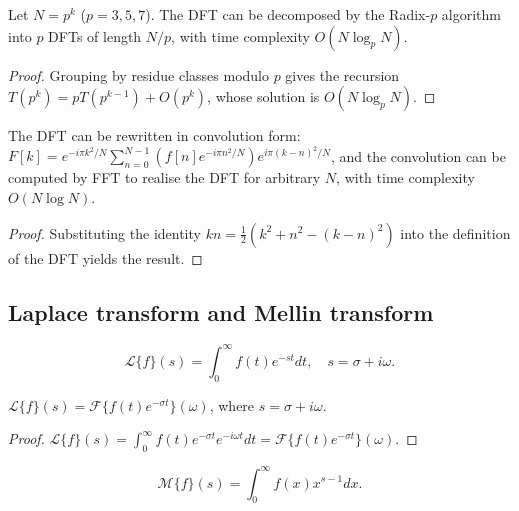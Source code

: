 \begin{theorem}\label{thm:radix_p_fft}
Let $N = p^k$ ($p = 3,5,7$). The DFT can be decomposed by the Radix-$p$ algorithm into $p$ DFTs of length $N/p$, with time complexity $O(N\log_p N)$.
\end{theorem}

\begin{proof}
Grouping by residue classes modulo $p$ gives the recursion $T(p^k) = pT(p^{k-1}) + O(p^k)$, whose solution is $O(N\log_p N)$.
\end{proof}

\begin{proposition}\label{prop:bluestein}
The DFT can be rewritten in convolution form: $F[k] = e^{-i\pi k^2/N} \sum_{n=0}^{N-1} (f[n] e^{-i\pi n^2/N}) e^{i\pi (k-n)^2/N}$, and the convolution can be computed by FFT to realise the DFT for arbitrary $N$, with time complexity $O(N\log N)$.
\end{proposition}

\begin{proof}
Substituting the identity $kn = \frac{1}{2}(k^2 + n^2 - (k-n)^2)$ into the definition of the DFT yields the result.
\end{proof}

\subsection{\texorpdfstring{Laplace transform and Mellin transform}{Laplace transform and Mellin transform}}

\begin{definition}\label{def:laplace}
\[\mathcal{L}\{f\}(s) = \int_0^\infty f(t) e^{-st} dt, \quad s = \sigma + i\omega.\]
\end{definition}

\begin{proposition}\label{prop:laplace_fourier}
$\mathcal{L}\{f\}(s) = \mathcal{F}\{f(t) e^{-\sigma t}\}(\omega)$, where $s = \sigma + i\omega$.
\end{proposition}

\begin{proof}
$\mathcal{L}\{f\}(s) = \int_0^\infty f(t)e^{-\sigma t}e^{-i\omega t}dt = \mathcal{F}\{f(t)e^{-\sigma t}\}(\omega)$.
\end{proof}

\begin{definition}\label{def:mellin}
\[\mathcal{M}\{f\}(s) = \int_0^\infty f(x) x^{s-1} dx.\]
\end{definition}

